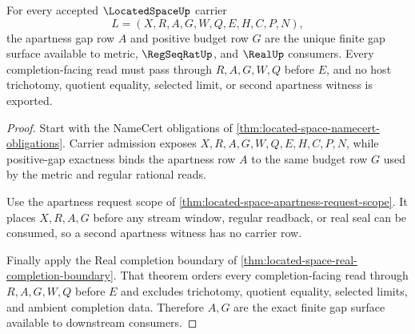 \begin{theorem}
\label{thm:located-space-positive-gap-exactness-route}
For every accepted $\LocatedSpaceUp$ carrier
$$
L=(X,R,A,G,W,Q,E,H,C,P,N),
$$
the apartness gap row $A$ and positive budget row $G$ are the unique finite gap surface available to metric, $\RegSeqRatUp$, and $\RealUp$ consumers. Every completion-facing read must pass through $R,A,G,W,Q$ before $E$, and no host trichotomy, quotient equality, selected limit, or second apartness witness is exported.
\end{theorem}
\begin{proof}
Start with the NameCert obligations of \autoref{thm:located-space-namecert-obligations}. Carrier admission exposes $X,R,A,G,W,Q,E,H,C,P,N$, while positive-gap exactness binds the apartness row $A$ to the same budget row $G$ used by the metric and regular rational reads.

Use the apartness request scope of \autoref{thm:located-space-apartness-request-scope}. It places $X,R,A,G$ before any stream window, regular readback, or real seal can be consumed, so a second apartness witness has no carrier row.

Finally apply the Real completion boundary of \autoref{thm:located-space-real-completion-boundary}. That theorem orders every completion-facing read through $R,A,G,W,Q$ before $E$ and excludes trichotomy, quotient equality, selected limits, and ambient completion data. Therefore $A,G$ are the exact finite gap surface available to downstream consumers.
\end{proof}

